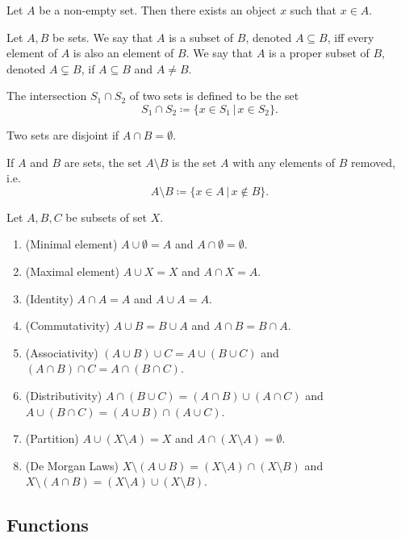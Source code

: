 \documentclass{article}
\begin{document}
\begin{lemma}
	Let \(A\) be a non-empty set. Then there exists an object \(x\) such that \(x\in A\).
\end{lemma}
\begin{definition}[Subset]
	Let \(A,B\) be sets. We say that \(A\) is a subset of \(B\), denoted \(A\subseteq B\), iff every element of \(A\) is also an element of \(B\). We say that \(A\) is a proper subset of \(B\), denoted \(A\subsetneq B\), if \(A\subseteq B\) and \(A\neq B\).
\end{definition}
\begin{definition}[Intersection]
	The intersection \(S_1\cap S_2\) of two sets is defined to be the set
	\begin{equation*}
		S_1\cap S_2\coloneq\{x\in S_1\,|\,x\in S_2\}.
	\end{equation*}
\end{definition}
\begin{definition}[Disjoint]
	Two sets are disjoint if \(A\cap B=\emptyset\).
\end{definition}
\begin{definition}
	If \(A\) and \(B\) are sets, the set \(A\setminus B\) is the set \(A\) with any elements of \(B\) removed, i.e.
	\begin{equation*}
		A\setminus B\coloneq\{x\in A\,|\,x\notin B\}.
	\end{equation*}
\end{definition}
\begin{proposition}
	Let \(A,B,C\) be subsets of set \(X\).
	\begin{enumerate}
		\item (Minimal element) \(A\cup\emptyset=A\) and \(A\cap\emptyset=\emptyset\).
		\item (Maximal element) \(A\cup X=X\) and \(A\cap X=A\).
		\item (Identity) \(A\cap A=A\) and \(A\cup A=A\).
		\item (Commutativity) \(A\cup B=B\cup A\) and \(A\cap B=B\cap A\).
		\item (Associativity) \((A\cup B)\cup C=A\cup(B\cup C)\) and \((A\cap B)\cap C=A\cap(B\cap C)\).
		\item (Distributivity) \(A\cap (B\cup C)=(A\cap B)\cup(A\cap C)\) and \(A\cup(B\cap C)=(A\cup B)\cap(A\cup C)\).
		\item (Partition) \(A\cup(X\setminus A)=X\) and \(A\cap (X\setminus A)=\emptyset\).
		\item (De Morgan Laws) \(X\setminus(A\cup B)=(X\setminus A)\cap(X\setminus B)\) and \(X\setminus (A\cap B)=(X\setminus A)\cup(X\setminus B)\).
	\end{enumerate}
\end{proposition}
\subsection{Functions}
\begin{definition}[Function]
	
\end{definition}
\end{document}

